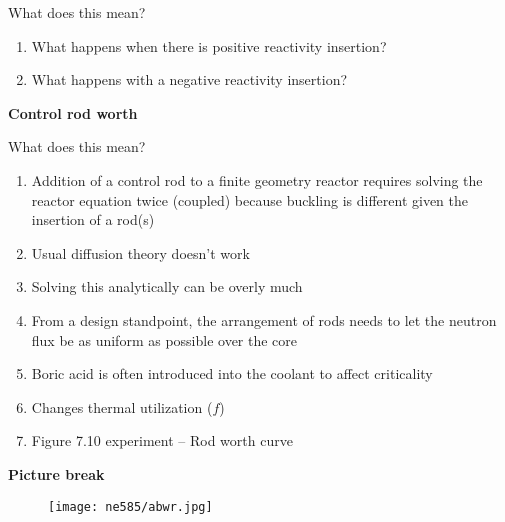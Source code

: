 \documentclass[aspectratio=1610,pdftex,dvipsnames,compress,xcolor={dvipsnames}]{beamer}
\begin{document}
\addtocounter{framenumber}{-1} 
\begin{frame}{What does this mean?}
    \begin{enumerate}[series=outerlist,topsep=0pt,itemsep=21pt,leftmargin=*,label=(\arabic*)]
        \item[]What happens when there is positive reactivity insertion?
        \item[]What happens with a negative reactivity insertion?
    \end{enumerate}
\end{frame}


\begin{frame}[plain]{}
    \centering\LARGE\textbf{Control rod worth}
\end{frame}


\addtocounter{framenumber}{-1} 
\begin{frame}{What does this mean?}
    \begin{enumerate}[series=outerlist,topsep=0pt,itemsep=18pt,leftmargin=*,label=(\arabic*)]
        \item[]Addition of a control rod to a finite geometry reactor requires solving the reactor equation twice (coupled) because buckling is different given the insertion of a rod(s)
        \item[]Usual diffusion theory doesn't work
        \item[]Solving this analytically can be overly much
        \item[]From a design standpoint, the arrangement of rods needs to let the neutron flux be as uniform as possible over the core
        \item[]Boric acid is often introduced into the coolant to affect criticality
        \item[]Changes thermal utilization ($f$)
        \item[]Figure 7.10 experiment -- Rod worth curve
    \end{enumerate}
\end{frame}


\begin{frame}[plain]{}
    \centering\LARGE\textbf{Picture break}
\end{frame}


\addtocounter{framenumber}{-1} 
\begin{frame}{}
    \begin{figure}
        \centering
        \texttt{[image: ne585/abwr.jpg]}
    \end{figure}
\end{frame}
\end{document}
